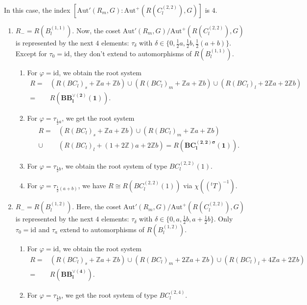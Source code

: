 \documentclass[11pt]{amsart}
\newcommand{\Z}{\mathbb{Z}}
\newcommand{\Aut}{\mathrm{Aut}}
\newcommand{\id}{\mathrm{id}}
\begin{document}
In this case, the index $[\Aut'(R_m,G):\Aut^+(R(C_l^{(2,2)}),G)]$ is $4$. 

\begin{enumerate}
\item[(I)] $R_-=R(B_l^{(1,1)})$. Now, the coset $\Aut'(R_m,G)/\Aut^+(R(C_l^{(2,2)}),G)$ is represented by the next $4$ elements: $\tau_\delta$ with $\delta \in \{0, \frac{1}{2}a, \frac{1}{2}b, \frac{1}{2}(a+b)\}$. Except for $\tau_0=\id$, they don't extend to automorphisms of $R(B_l^{(1,1)})$.
\begin{enumerate}
\item[(i)] For $\varphi=\id$, we obtain the root system
\begin{align*}
R=
&(R(BC_l)_s+\Z a+\Z b) \cup (R(BC_l)_m+\Z a+\Z b) \cup (R(BC_l)_l+2\Z a+2\Z b) \\
=
&R(\mathbf{BB_l^{\vee (2)}(1)}).
\end{align*}
\item[(ii)] For $\varphi=\tau_{\frac{1}{2}a}$, we get the root system
\begin{align*}
 R=
 &(R(BC_l)_s+\Z a+\Z b) \cup (R(BC_l)_m+\Z a+\Z b)\\
 \cup
&(R(BC_l)_l+(1+2\Z) a+2\Z b)= R(\mathbf{BC_l^{(2,2)\sigma}(1)}).
\end{align*}
\item[(iii)] For $\varphi=\tau_{\frac{1}{2}b}$, we obtain the root system of type $BC_l^{(2,2)}(1)$.
\item[(iv)] For $\varphi=\tau_{\frac{1}{2}(a+b)}$, we have $R\cong R(BC_l^{(2,2)}(1))$ via $\chi(({}^tT)^{-1})$. 
\end{enumerate}
\item[(II)] $R_-=R(B_l^{(1,2)})$. Here, the coset $\Aut'(R_m,G)/\Aut^+(R(C_l^{(2,2)}),G)$ is represented by the next $4$ elements: $\tau_\delta$ with $\delta \in \{0, a, \frac{1}{2}b, a+\frac{1}{2}b\}$. Only $\tau_0=\id$ and $\tau_a$ extend to automorphisms of $R(B_l^{(1,2)})$.
\begin{enumerate}
\item[(i)] For $\varphi=\id$, we obtain the root system
\begin{align*}
R=
&(R(BC_l)_s+\Z a+\Z b) \cup (R(BC_l)_m+2\Z a+\Z b) \cup (R(BC_l)_l+4\Z a+2\Z b) \\
=
& R(\mathbf{BB_l^{\vee (4)}}).
\end{align*}
\item[(ii)] For $\varphi=\tau_{\frac{1}{2}b}$, we get the root system of type $BC_l^{(2,4)}$.
\end{enumerate}
\end{enumerate}
\end{document}
